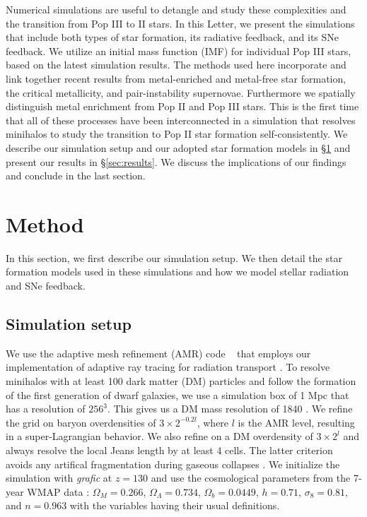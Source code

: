 \documentclass[apjl]{emulateapj}
\begin{document}
Numerical simulations are useful to detangle and study these
complexities and the transition from Pop III to II stars.  In this
Letter, we present the simulations that include both types of star
formation, its radiative feedback, and its SNe feedback.  We utilize
an initial mass function (IMF) for individual Pop III stars, based on
the latest simulation results.  The methods used here incorporate and
link together recent results from metal-enriched and metal-free star
formation, the critical metallicity, and pair-instability supernovae.
Furthermore we spatially distinguish metal enrichment from Pop II and
Pop III stars.  This is the first time that all of these processes
have been interconnected in a simulation that resolves minihalos to
study the transition to Pop II star formation self-consistently.  We
describe our simulation setup and our adopted star formation models in
\S \ref{sec:setup} and present our results in \S \ref{sec:results}.
We discuss the implications of our findings and conclude in the last
section.

\section{Method}
\label{sec:setup}

In this section, we first describe our simulation setup.  We then
detail the star formation models used in these simulations and how we
model stellar radiation and SNe feedback.

\subsection{Simulation setup}

We use the adaptive mesh refinement (AMR) code
\enzo~\citep{BryanNorman1997, OShea2004} that employs our
implementation of adaptive ray tracing for radiation transport
\citep{Wise10}.  To resolve minihalos with at least 100 dark matter
(DM) particles and follow the formation of the first generation of
dwarf galaxies, we use a simulation box of 1 Mpc that has a resolution
of $256^3$.  This gives us a DM mass resolution of 1840 \Ms.  We
refine the grid on baryon overdensities of $3 \times 2^{-0.2l}$, where
$l$ is the AMR level, resulting in a super-Lagrangian behavior.  We
also refine on a DM overdensity of $3 \times 2^l$ and always resolve
the local Jeans length by at least 4 cells.  The latter criterion
avoids any artifical fragmentation during gaseous collapses
\citep{Truelove97}.  We initialize the simulation with \textsl{grafic}
\citep{Bertschinger01} at $z = 130$ and use the cosmological
parameters from the 7-year WMAP data \citep{WMAP7}: $\Omega_M =
0.266$, $\Omega_\Lambda = 0.734$, $\Omega_b = 0.0449$, $h = 0.71$,
$\sigma_8 = 0.81$, and $n = 0.963$ with the variables having their
usual definitions.
\end{document}

